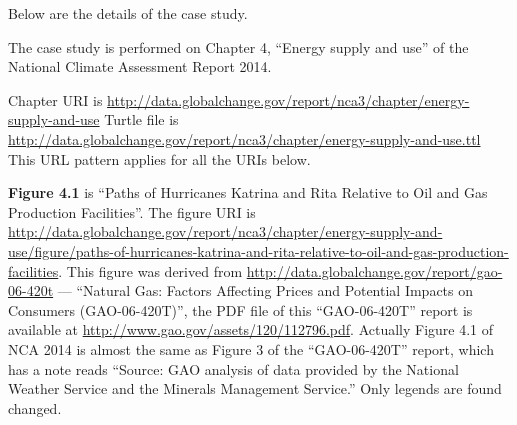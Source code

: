Below are the details of the case study.

The case study is performed on Chapter 4, ``Energy supply and use'' of the National Climate Assessment Report 2014.

Chapter URI is \url{http://data.globalchange.gov/report/nca3/chapter/energy-supply-and-use}
Turtle file is \url{http://data.globalchange.gov/report/nca3/chapter/energy-supply-and-use.ttl}
This URL pattern applies for all the URIs below.

\textbf{Figure 4.1} is ``Paths of Hurricanes Katrina and Rita Relative to Oil and Gas Production Facilities''. The
figure URI is \url{http://data.globalchange.gov/report/nca3/chapter/energy-supply-and-use/figure/paths-of-hurricanes-katrina-and-rita-relative-to-oil-and-gas-production-facilities}.
This figure was derived from \url{http://data.globalchange.gov/report/gao-06-420t} --- ``Natural Gas: Factors Affecting Prices and Potential Impacts on Consumers (GAO-06-420T)'', the 
PDF file of this ``GAO-06-420T'' report is available at \url{http://www.gao.gov/assets/120/112796.pdf}.
Actually Figure 4.1 of NCA 2014 is almost the same as Figure 3 of the ``GAO-06-420T'' report, which has a note reads ``Source: GAO analysis of data provided by the National Weather Service and the Minerals Management Service.''
Only legends are found changed.

